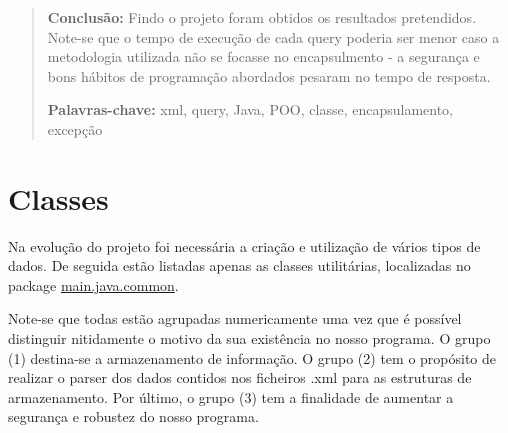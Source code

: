 \documentclass[11pt,a4paper]{article}
\begin{document}
\begin{abstract}
\textbf{Conclusão:} Findo o projeto foram obtidos os resultados pretendidos. Note-se que o tempo de execução de cada query poderia ser
menor caso a metodologia utilizada não se focasse no encapsulmento - a segurança e bons hábitos de programação abordados pesaram no tempo de
resposta.\newline

\textbf{Palavras-chave:} xml, query, Java, POO, classe, encapsulamento, excepção

\end{abstract}

\newpage
\tableofcontents

\newpage
\section{Classes}

\label{sec:classes}
Na evolução do projeto foi necessária a criação e utilização de vários tipos de dados. De seguida estão listadas
apenas as classes utilitárias, localizadas no package \underline{main.java.common}.\newline

Note-se que todas estão agrupadas numericamente uma vez que é possível distinguir nitidamente o motivo da sua
existência no nosso programa. O grupo (1) destina-se a armazenamento de informação. O grupo (2) tem o propósito de
realizar o parser dos dados contidos nos ficheiros .xml para as estruturas de armazenamento. Por último, o grupo (3) tem a finalidade
de aumentar a segurança e robustez do nosso programa.
\end{document}
